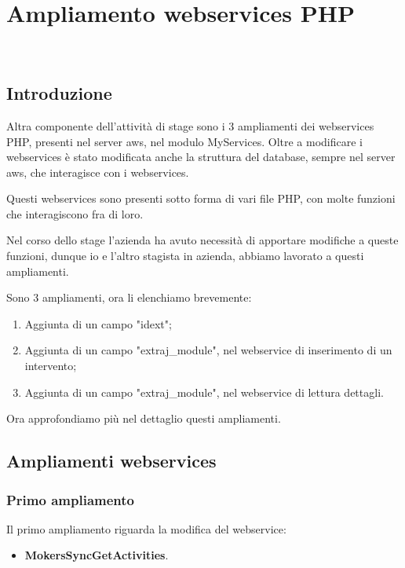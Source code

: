 
\chapter{Ampliamento webservices PHP}
\label{cap:webservices}

\\

\section{Introduzione}
Altra componente dell'attività di stage sono i 3 ampliamenti dei webservices PHP, presenti nel server \gls{aws}, nel modulo MyServices. Oltre a modificare i webservices è stato modificata anche la struttura del database, sempre nel server \gls{aws}, che interagisce con i webservices.

Questi webservices sono presenti sotto forma di vari file PHP, con molte funzioni che interagiscono fra di loro.

Nel corso dello stage l'azienda ha avuto necessità di apportare modifiche a queste funzioni, dunque io e l'altro stagista in azienda, abbiamo lavorato a questi ampliamenti.

Sono 3 ampliamenti, ora li elenchiamo brevemente:
\begin{enumerate}
	\item Aggiunta di un campo "idext";
	\item Aggiunta di un campo "extraj\_module", nel webservice di inserimento di un intervento;
	\item Aggiunta di un campo "extraj\_module", nel webservice di lettura dettagli.
\end{enumerate}

Ora approfondiamo più nel dettaglio questi ampliamenti.

\newpage

\section{Ampliamenti webservices}
\subsection{Primo ampliamento}
Il primo ampliamento riguarda la modifica del webservice:
\begin{itemize}
	\item \textbf{MokersSyncGetActivities}.
\end{itemize}

